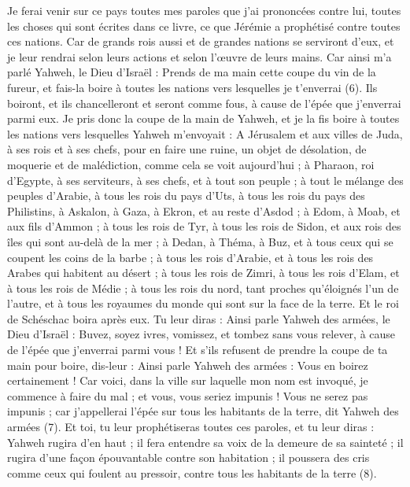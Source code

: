 \begin{multicols}{2}
Je ferai venir sur ce pays toutes mes paroles que j'ai prononcées contre lui, toutes les choses qui sont écrites dans ce livre, ce que Jérémie a prophétisé contre toutes ces nations.
Car de grands rois aussi et de grandes nations se serviront d'eux, et je leur rendrai selon leurs actions et selon l'œuvre de leurs mains.
Car ainsi m’a parlé Yahweh, le Dieu d'Israël : Prends de ma main cette coupe du vin de la fureur, et fais-la boire à toutes les nations vers lesquelles je t'enverrai\FTNT{} (6).
Ils boiront, et ils chancelleront et seront comme fous, à cause de l'épée que j'enverrai parmi eux.
Je pris donc la coupe de la main de Yahweh, et je la fis boire à toutes les nations vers lesquelles Yahweh m'envoyait :
A Jérusalem et aux villes de Juda, à ses rois et à ses chefs, pour en faire une ruine, un objet de désolation, de moquerie et de malédiction, comme cela se voit aujourd'hui ;
à Pharaon, roi d'Egypte, à ses serviteurs, à ses chefs, et à tout son peuple ;
à tout le mélange des peuples d'Arabie, à tous les rois du pays d’Uts, à tous les rois du pays des Philistins, à Askalon, à Gaza, à Ekron, et au reste d'Asdod ;
à Edom, à Moab, et aux fils d’Ammon ;
à tous les rois de Tyr, à tous les rois de Sidon, et aux rois des îles qui sont au-delà de la mer ;
à Dedan, à Théma, à Buz, et à tous ceux qui se coupent les coins de la barbe ;
à tous les rois d'Arabie, et à tous les rois des Arabes qui habitent au désert ;
à tous les rois de Zimri, à tous les rois d’Elam, et à tous les rois de Médie ;
à tous les rois du nord, tant proches qu'éloignés l'un de l'autre, et à tous les royaumes du monde qui sont sur la face de la terre. Et le roi de Schéschac boira après eux.
Tu leur diras : Ainsi parle Yahweh des armées, le Dieu d'Israël : Buvez, soyez ivres, vomissez, et tombez sans vous relever, à cause de l'épée que j'enverrai parmi vous !
Et s'ils refusent de prendre la coupe de ta main pour boire, dis-leur : Ainsi parle Yahweh des armées : Vous en boirez certainement !
Car voici, dans la ville sur laquelle mon nom est invoqué, je commence à faire du mal ; et vous, vous seriez impunis ! Vous ne serez pas impunis ; car j’appellerai l'épée sur tous les habitants de la terre, dit Yahweh des armées\FTNT{} (7).
Et toi, tu leur prophétiseras toutes ces paroles, et tu leur diras : Yahweh rugira d'en haut ; il fera entendre sa voix de la demeure de sa sainteté ; il rugira d'une façon épouvantable contre son habitation ; il poussera des cris comme ceux qui foulent au pressoir, contre tous les habitants de la terre\FTNT{} (8).

\end{multicols}
